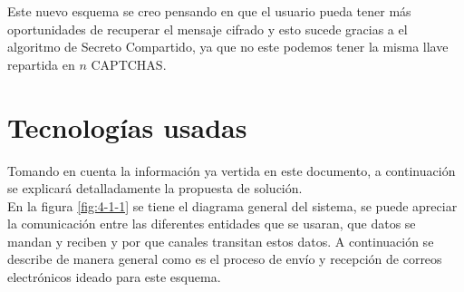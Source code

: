 \documentclass[12pt,oneside,onecolumn,openany]{report}
\begin{document}
Este nuevo esquema se creo pensando en que el usuario pueda tener más oportunidades de recuperar el mensaje cifrado y esto sucede gracias a el algoritmo de Secreto Compartido, ya que no este podemos tener la misma llave repartida en $n$ CAPTCHAS.


        
\chapter{Tecnologías usadas}

Tomando en cuenta la información ya vertida en este documento, a continuación se explicará detalladamente la propuesta de solución.\\
En la figura \ref{fig:4-1-1} se tiene el diagrama general del sistema, se puede apreciar la comunicación entre las diferentes entidades que se usaran, que datos se mandan y reciben y por que canales transitan estos datos. A continuación se describe de manera general como es el proceso de envío y recepción de correos electrónicos ideado para este esquema.\\
\end{document}
